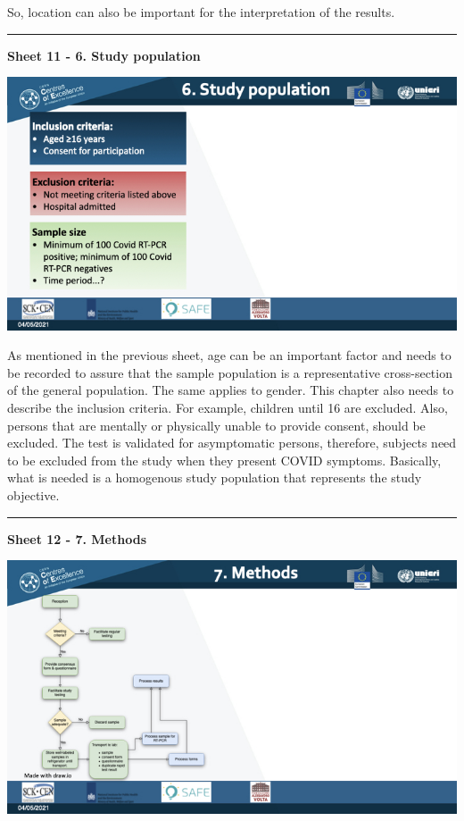 \documentclass[
]{book}
\begin{document}
So, location can also be important for the interpretation of the
results.

\begin{center}\rule{0.5\linewidth}{0.5pt}\end{center}

\textbf{Sheet 11 - 6. Study population}

\includegraphics{images/m03/m03_validation_of_test_kits_v2_2.011.jpeg}

As mentioned in the previous sheet, age can be an important factor and
needs to be recorded to assure that the sample population is a
representative cross-section of the general population. The same applies
to gender. This chapter also needs to describe the inclusion criteria.
For example, children until 16 are excluded. Also, persons that are
mentally or physically unable to provide consent, should be excluded.
The test is validated for asymptomatic persons, therefore, subjects need
to be excluded from the study when they present COVID symptoms.
Basically, what is needed is a homogenous study population that
represents the study objective.

\begin{center}\rule{0.5\linewidth}{0.5pt}\end{center}

\textbf{Sheet 12 - 7. Methods}

\includegraphics{images/m03/m03_validation_of_test_kits_v2_2.012.jpeg}
\end{document}
